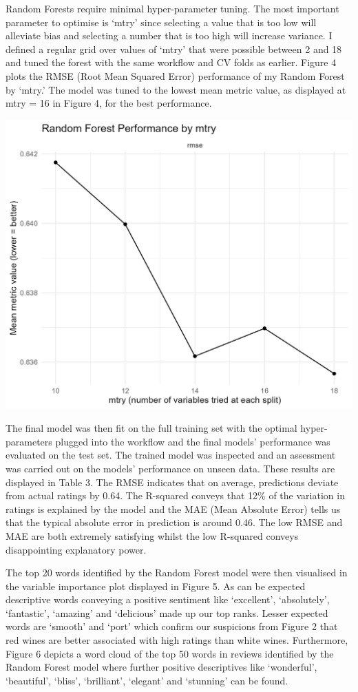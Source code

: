 \documentclass[11pt,preprint]{elsarticle}
\let\origfigure\figure
\let\endorigfigure\endfigure
\renewenvironment{figure}[1][2] {
    \expandafter\origfigure\expandafter[H]
} {
    \endorigfigure
}
\numberwithin{equation}{section}
\numberwithin{figure}{section}
\numberwithin{table}{section}
\begin{document}
Random Forests require minimal hyper-parameter tuning. The most
important parameter to optimise is `mtry' since selecting a value that
is too low will alleviate bias and selecting a number that is too high
will increase variance. I defined a regular grid over values of `mtry'
that were possible between 2 and 18 and tuned the forest with the same
workflow and CV folds as earlier. Figure 4 plots the RMSE (Root Mean
Squared Error) performance of my Random Forest by `mtry.' The model was
tuned to the lowest mean metric value, as displayed at mtry = 16 in
Figure 4, for the best performance.

\begin{figure}[H]
\includegraphics[width=0.8\linewidth]{writeup/fig4} \caption{Random Forest Performance by 'mtry'}\label{fig:fig4}
\end{figure}

The final model was then fit on the full training set with the optimal
hyper-parameters plugged into the workflow and the final models'
performance was evaluated on the test set. The trained model was
inspected and an assessment was carried out on the models' performance
on unseen data. These results are displayed in Table 3. The RMSE
indicates that on average, predictions deviate from actual ratings by
0.64. The R-squared conveys that 12\% of the variation in ratings is
explained by the model and the MAE (Mean Absolute Error) tells us that
the typical absolute error in prediction is around 0.46. The low RMSE
and MAE are both extremely satisfying whilst the low R-squared conveys
disappointing explanatory power.

The top 20 words identified by the Random Forest model were then
visualised in the variable importance plot displayed in Figure 5. As can
be expected descriptive words conveying a positive sentiment like
`excellent', `absolutely', `fantastic', `amazing' and `delicious' made
up our top ranks. Lesser expected words are `smooth' and `port' which
confirm our suspicions from Figure 2 that red wines are better
associated with high ratings than white wines. Furthermore, Figure 6
depicts a word cloud of the top 50 words in reviews identified by the
Random Forest model where further positive descriptives like
`wonderful', `beautiful', `bliss', `brilliant', `elegant' and `stunning'
can be found.
\end{document}
